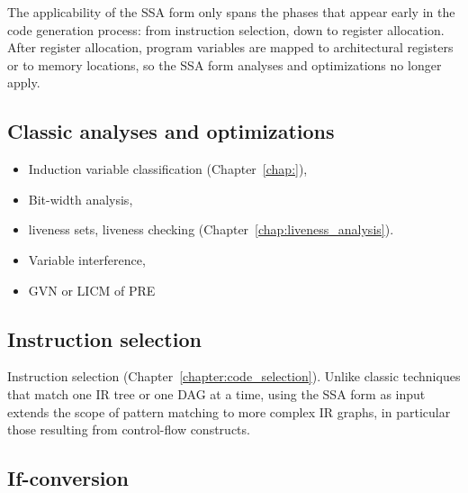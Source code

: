 The applicability of the SSA form only spans the phases that appear
early in the code generation process: from instruction selection, down to
register allocation. After register allocation, program variables are mapped to
architectural registers or to memory locations, so the SSA form analyses and
optimizations no longer apply.

\subsection{Classic analyses and optimizations}

\begin{itemize}

\item Induction variable classification (Chapter~\ref{chap:}),

\item Bit-width analysis,

\item liveness sets, liveness checking
(Chapter~\ref{chap:liveness_analysis}).

\item Variable interference,

\item GVN or LICM of PRE

\end{itemize}

\subsection{Instruction selection}

Instruction selection (Chapter~\ref{chapter:code_selection}). Unlike
classic techniques that match one IR tree or one DAG at a time, using the SSA
form as input extends the scope of pattern matching to more complex IR graphs,
in particular those resulting from control-flow constructs.

\subsection{If-conversion}

